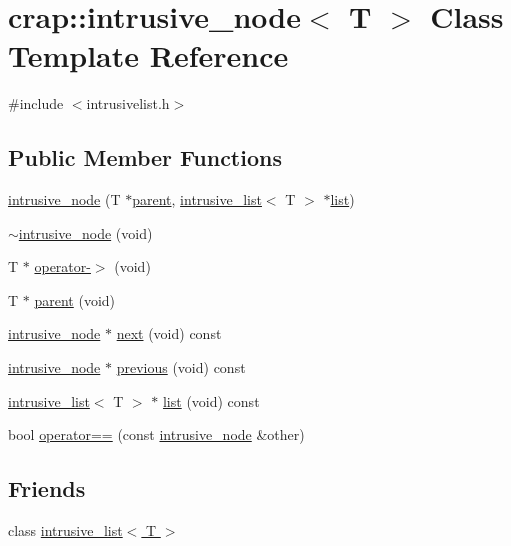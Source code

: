 \hypertarget{classcrap_1_1intrusive__node}{\section{crap\+:\+:intrusive\+\_\+node$<$ T $>$ Class Template Reference}
\label{classcrap_1_1intrusive__node}
}


{\ttfamily \#include $<$intrusivelist.\+h$>$}

\subsection*{Public Member Functions}
\begin{DoxyCompactItemize}
\item 
\hyperlink{classcrap_1_1intrusive__node_a7863e5579135b4b6e3c9b22254f1d811}{intrusive\+\_\+node} (T $\ast$\hyperlink{classcrap_1_1intrusive__node_a64fa7fffc54fe23e13c2b42f610ac52c}{parent}, \hyperlink{singletoncrap_1_1intrusive__list}{intrusive\+\_\+list}$<$ T $>$ $\ast$\hyperlink{classcrap_1_1list}{list})
\item 
\hyperlink{classcrap_1_1intrusive__node_aec5f593295bf0dd3134ea26eafd4a9ba}{$\sim$intrusive\+\_\+node} (void)
\item 
T $\ast$ \hyperlink{classcrap_1_1intrusive__node_aaf1a29a9a378c9bb05e01fe579540e33}{operator-\/$>$} (void)
\item 
T $\ast$ \hyperlink{classcrap_1_1intrusive__node_a64fa7fffc54fe23e13c2b42f610ac52c}{parent} (void)
\item 
\hyperlink{classcrap_1_1intrusive__node}{intrusive\+\_\+node} $\ast$ \hyperlink{classcrap_1_1intrusive__node_a284c8a3480e6e5195633b01d90abf85d}{next} (void) const 
\item 
\hyperlink{classcrap_1_1intrusive__node}{intrusive\+\_\+node} $\ast$ \hyperlink{classcrap_1_1intrusive__node_a366a5d51e32c3d204d229dd36785495b}{previous} (void) const 
\item 
\hyperlink{singletoncrap_1_1intrusive__list}{intrusive\+\_\+list}$<$ T $>$ $\ast$ \hyperlink{classcrap_1_1intrusive__node_abfef045836dcfefba5c5189267d0cedd}{list} (void) const 
\item 
bool \hyperlink{classcrap_1_1intrusive__node_a03a03db2b8ce66d8f3a609ac432bcb87}{operator==} (const \hyperlink{classcrap_1_1intrusive__node}{intrusive\+\_\+node} \&other)
\end{DoxyCompactItemize}
\subsection*{Friends}
\begin{DoxyCompactItemize}
\item 
class \hyperlink{classcrap_1_1intrusive__node_a8abfe7a49da2ca301723ee176edb482f}{intrusive\+\_\+list$<$ T $>$}
\end{DoxyCompactItemize}


